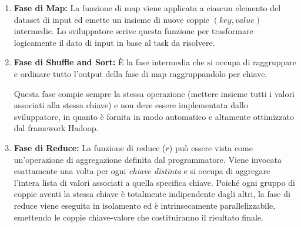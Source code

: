 \begin{enumerate}
    \item \textbf{Fase di Map:} La funzione di map viene applicata a ciascun elemento del dataset di input ed emette un insieme di nuove coppie \((key, value)\) intermedie. Lo sviluppatore scrive questa funzione per trasformare logicamente il dato di input in base al task da risolvere.
    
    \item \textbf{Fase di Shuffle and Sort:} È la fase intermedia che si occupa di raggruppare e ordinare tutto l'output della fase di map raggruppandolo per chiave. 
    \begin{remark}
        Questa fase compie sempre la stessa operazione (mettere insieme tutti i valori associati alla stessa chiave) e non deve essere implementata dallo sviluppatore, in quanto è fornita in modo automatico e altamente ottimizzato dal framework Hadoop.
    \end{remark}
    
    \item \textbf{Fase di Reduce:} La funzione di reduce ($r$) può essere vista come un'operazione di aggregazione definita dal programmatore. Viene invocata esattamente una volta per ogni \textit{chiave distinta} e si occupa di aggregare l'intera lista di valori associati a quella specifica chiave. Poiché ogni gruppo di coppie aventi la stessa chiave è totalmente indipendente dagli altri, la fase di reduce viene eseguita in isolamento ed è intrinsecamente parallelizzabile, emettendo le coppie chiave-valore che costituiranno il risultato finale.
\end{enumerate}

